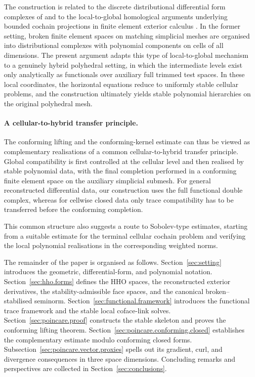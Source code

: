 \documentclass[a4paper,11pt]{article}
\theoremstyle{definition}
\begin{document}
The construction is related to the discrete distributional differential form complexes of \cite{Licht:17,Christiansen.Licht:20} and to the local-to-global homological arguments underlying bounded cochain projections in finite element exterior calculus \cite{Falk.Winther:14,Falk.Winther:15}.
In the former setting, broken finite element spaces on matching simplicial meshes are organised into distributional complexes with polynomial components on cells of all dimensions.
The present argument adapts this type of local-to-global mechanism to a genuinely hybrid polyhedral setting, in which the intermediate levels exist only analytically as functionals over auxiliary full trimmed test spaces.
In these local coordinates, the horizontal equations reduce to uniformly stable cellular problems, and the construction ultimately yields stable polynomial hierarchies on the original polyhedral mesh.

\paragraph*{A cellular-to-hybrid transfer principle.}

The conforming lifting and the conforming-kernel estimate can thus be viewed as complementary realisations of a common cellular-to-hybrid transfer principle.
Global compatibility is first controlled at the cellular level and then realised by stable polynomial data, with the final completion performed in a conforming finite element space on the auxiliary simplicial submesh.
For general reconstructed differential data, our construction uses the full functional double complex, whereas for cellwise closed data only trace compatibility has to be transferred before the conforming completion.

This common structure also suggests a route to Sobolev-type estimates, starting from a suitable estimate for the terminal cellular cochain problem and verifying the local polynomial realisations in the corresponding weighted norms.

The remainder of the paper is organised as follows.
Section~\ref{sec:setting} introduces the geometric, differential-form, and polynomial notation.
Section~\ref{sec:hho.forms} defines the HHO spaces, the reconstructed exterior derivatives, the stability-admissible face spaces, and the canonical broken--stabilised seminorm.
Section~\ref{sec:functional.framework} introduces the functional trace framework and the stable local coface-link solves.
Section~\ref{sec:poincare.proof} constructs the stable skeleton and proves the conforming lifting theorem.
Section~\ref{sec:poincare.conforming.closed} establishes the complementary estimate modulo conforming closed forms.
Subsection~\ref{sec:poincare.vector.proxies} spells out its gradient, curl, and divergence consequences in three space dimensions.
Concluding remarks and perspectives are collected in Section~\ref{sec:conclusions}.
\end{document}
